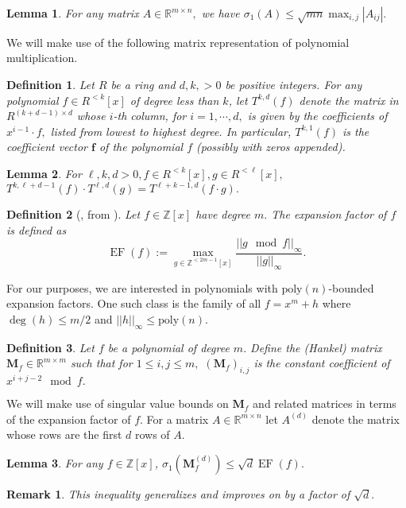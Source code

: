 \documentclass[11pt]{article}
\newcommand{\poly}[2]{{#1}^{<#2}[x]}
\newcommand{\Z}{\mathbb{Z}}
\newcommand{\R}{\mathbb{R}}
\newcommand{\abs}[1]{|#1 |}
\newcommand{\dabs}[1]{||#1 ||}
\newtheorem{lemma}{Lemma}[section]
\newtheorem{remark}{Remark}[section]
\newtheorem{definition}{Definition}[section]
\DeclareMathOperator{\ef}{EF}
\newcommand{\vnote}[1]{\textcolor{red}{Vinod's note: {#1}}}
\begin{document}
\begin{lemma} \label{lemma:singVar}
For any matrix $A \in \R^{m\times n},$ we have $\sigma_1(A) \leq \sqrt{mn} \max_{i,j} \abs{A_{ij}}.$ 
\end{lemma}
We will make use of the following matrix representation of polynomial multiplication.
\begin{definition}
Let $R$ be a ring and $d, k, > 0$ be positive integers. For any polynomial $f \in \poly{R}{k}$ of degree less than $k$, let $T^{k,d}(f)$ denote the matrix in $R^{ (k+d-1) \times d}$ whose $i$-th column, for $i = 1, \cdots , d,$ is given by the coefficients of $x^{i-1}\cdot f,$ listed from lowest to highest degree. In particular, $T^{k,1}(f)$ is the coefficient vector $\textbf{f}$ of the polynomial $f$ (possibly with zeros appended). 
\end{definition}
\begin{lemma} \label{lemma:matpoly}
For $\ell,k,d > 0, f \in \poly{R}{k}, g \in \poly{R}{\ell},$ $T^{k,\ell+d-1}(f) \cdot T^{\ell,d}(g) = T^{\ell+k-1, d}(f\cdot g). $
\end{lemma}
\begin{definition}[\cite{MPLWE}, from \cite{LyuMic06icalp}]
Let $f\in \Z[x]$ have degree $m.$ The expansion factor of $f$ is defined as 
\[\ef(f) := \underset{g\in \poly{\Z}{2m-1}}{\max}\frac{\dabs{g \mod f}_{\infty}} {\dabs{g}_{\infty}}.
\]
\end{definition}
For our purposes, we are interested in polynomials with $\text{poly}(n)$-bounded expansion factors. One such class \cite{LyuMic06icalp} is the family of all $f = x^m + h$ where $\deg(h) \leq m/2$ and $\dabs{h}_{\infty} \leq \text{poly}(n).$
\begin{definition}
Let $f$ be a polynomial of degree $m.$ Define the (Hankel) matrix $\textbf{M}_f\in \R^{m\times m} $ such that for $1\leq i,j \leq m,$ $(\textbf{M}_f)_{i,j} $ is the constant coefficient of $x^{i+j-2} \mod f.$ 
\end{definition}
We will make use of singular value bounds on $\mathbf M_f$ and related matrices in terms of the expansion factor of $f$. For a matrix $A\in  \R^{m\times n}$ let $A^{(d)}$ denote the matrix whose rows are the first $d$ rows of $A.$ 
\begin{lemma} \label{lemma:ef}
For any $f\in \Z[x]$, $\sigma_1(\textbf{M}_f^{(d)}) \leq \sqrt{d} \ef(f).$
\end{lemma}
\begin{remark} This inequality generalizes and improves on \autocite[Theorem 2.8]{MPLWE} by a factor of $\sqrt{d}.$

\end{remark}
\end{document}
